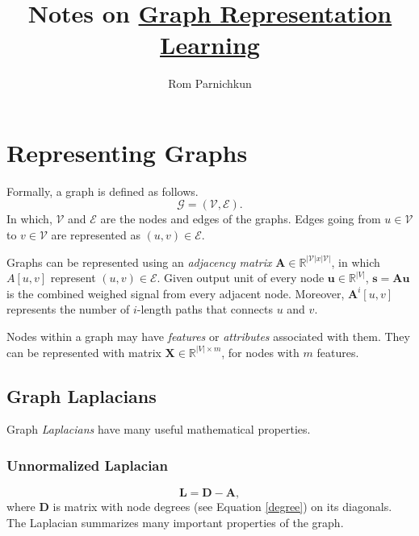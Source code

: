\documentclass[twocolumn]{article}
\theoremstyle{plain}
\begin{document}
\title{Notes on \href{https://www.cs.mcgill.ca/~wlh/grl_book/files/GRL_Book.pdf}{Graph Representation Learning}}
\author{Rom Parnichkun}

\maketitle

\section{Representing Graphs}

Formally, a graph is defined as follows.
\begin{equation}
\mathcal{G} = (\mathcal{V}, \mathcal{E}).
\end{equation}
In which, $\mathcal{V}$ and $\mathcal{E}$ are the nodes and edges of the graphs. Edges going from $u \in \mathcal{V}$ to $v \in \mathcal{V}$ are represented as $(u,v) \in \mathcal{E}$.

Graphs can be represented using an \textit{adjacency matrix} $\textbf{A} \in \mathbb{R}^{|\mathcal{V}|x|\mathcal{V}|}$, in which $A[u,v]$ represent $(u,v) \in \mathcal{E}$. Given output unit of every node $\mathbf{u} \in \mathbb{R}^{|V|}$, $\mathbf{s} = \mathbf{A}\mathbf{u}$ is the combined weighed signal from every adjacent node. Moreover, $\mathbf{A}^i[u,v]$ represents the number of $i$-length paths that connects $u$ and $v$.

Nodes within a graph may have \textit{features} or \textit{attributes} associated with them. They can be represented with matrix $\textbf{X} \in \mathbb{R}^{|V|\times m}$, for nodes with $m$ features.

\subsection{Graph Laplacians}

Graph \textit{Laplacians} have many useful mathematical properties.

\subsubsection{Unnormalized Laplacian}

\begin{equation}
    \mathbf{L} = \mathbf{D} - \mathbf{A},
\end{equation}
where $\mathbf{D}$ is  matrix with node degrees (see Equation \ref{degree}) on its diagonals. The Laplacian summarizes many important properties of the graph.
\end{document}
